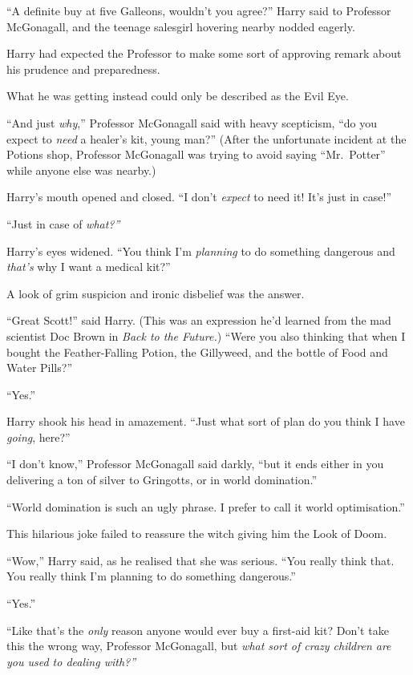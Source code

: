 ``A definite buy at five Galleons, wouldn't you agree?'' Harry said to
Professor McGonagall, and the teenage salesgirl hovering nearby nodded
eagerly.

Harry had expected the Professor to make some sort of approving remark
about his prudence and preparedness.

What he was getting instead could only be described as the Evil Eye.

``And just \emph{why},'' Professor McGonagall said with heavy
scepticism, ``do you expect to \emph{need} a healer's kit, young man?''
(After the unfortunate incident at the Potions shop, Professor
McGonagall was trying to avoid saying ``Mr.~Potter'' while anyone else
was nearby.)

Harry's mouth opened and closed. ``I don't \emph{expect} to need it!
It's just in case!''

``Just in case of \emph{what?''}

Harry's eyes widened. ``You think I'm \emph{planning} to do something
dangerous and \emph{that's} why I want a medical kit?''

A look of grim suspicion and ironic disbelief was the answer.

``Great Scott!'' said Harry. (This was an expression he'd learned from
the mad scientist Doc Brown in \emph{Back to the Future.}) ``Were you
also thinking that when I bought the Feather-Falling Potion, the
Gillyweed, and the bottle of Food and Water Pills?''

``Yes.''

Harry shook his head in amazement. ``Just what sort of plan do you think
I have \emph{going}, here?''

``I don't know,'' Professor McGonagall said darkly, ``but it ends either
in you delivering a ton of silver to Gringotts, or in world
domination.''

``World domination is such an ugly phrase. I prefer to call it world
optimisation.''

This hilarious joke failed to reassure the witch giving him the Look of
Doom.

``Wow,'' Harry said, as he realised that she was serious. ``You really
think that. You really think I'm planning to do something dangerous.''

``Yes.''

``Like that's the \emph{only} reason anyone would ever buy a first-aid
kit? Don't take this the wrong way, Professor McGonagall, but \emph{what
sort of crazy children are you used to dealing with?''}

